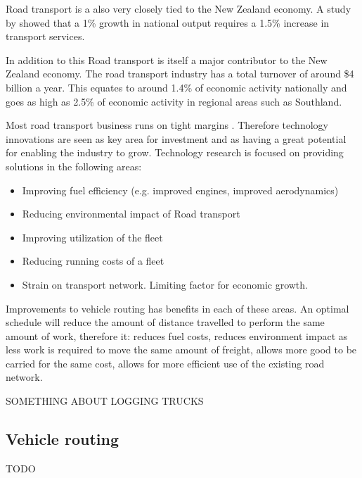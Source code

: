 Road transport is a also very closely tied to the New Zealand economy. A study by \cite{?} showed that a 1\% growth in national output requires a 1.5\% increase in transport services.

In addition to this Road transport is itself a major contributor to the New Zealand economy. The road transport industry has a total turnover of around \$4 billion a year. This equates to around 1.4\% of economic activity nationally and goes as high as 2.5\% of economic activity in regional areas such as Southland\cite{RTFNZ}.

% 

Most road transport business runs on tight margins \cite{NEED A CITE FOR THIS}. Therefore technology innovations are seen as key area for investment and as having a great potential for enabling the industry to grow. Technology research is focused on providing solutions in the following areas:
\begin{itemize}
	\item Improving fuel efficiency (e.g. improved engines, improved aerodynamics)
	\item Reducing environmental impact of Road transport
	\item Improving utilization of the fleet
	\item Reducing running costs of a fleet
	\item Strain on transport network. Limiting factor for economic growth.
\end{itemize}

Improvements to vehicle routing has benefits in each of these areas. An optimal schedule will reduce the amount of distance travelled to perform the same amount of work, therefore it: reduces fuel costs, reduces environment impact as less work is required to move the same amount of freight, allows more good to be carried for the same cost, allows for more efficient use of the existing road network.  

SOMETHING ABOUT LOGGING TRUCKS

\subsection{Vehicle routing}


TODO
